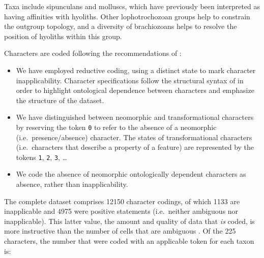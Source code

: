 \documentclass[openany]{book}
\begin{document}
Taxa include sipunculans and molluscs, which have previously been
interpreted as having affinities with hyoliths. Other lophotrochozoan
groups help to constrain the outgroup topology, and a diversity of
brachiozoans helps to resolve the position of hyoliths within this
group.

Characters are coded following the recommendations of
\citet{Brazeau2018}:

\begin{itemize}
\item
  We have employed reductive coding, using a distinct state to mark
  character inapplicability. Character specifications follow the
  structural syntax of \citet{Sereno2007} in order to highlight
  ontological dependence between characters and emphasize the structure
  of the dataset.
\item
  We have distinguished between neomorphic and transformational
  characters \citep[sensu][]{Sereno2007} by reserving the token
  \texttt{0} to refer to the absence of a neomorphic
  (i.e.~presence/absence) character. The states of transformational
  characters (i.e.~characters that describe a property of a feature) are
  represented by the tokens \texttt{1}, \texttt{2}, \texttt{3}, \ldots{}
\item
  We code the absence of neomorphic ontologically dependent characters
  \citep[sensu][]{Vogt2017} as absence, rather than inapplicability.
\end{itemize}

The complete dataset comprises 12150 character codings, of which 1133
are inapplicable and 4975 were positive statements (i.e.~neither
ambiguous nor inapplicable). This latter value, the amount and quality
of data that \emph{is} coded, is more instructive than the number of
cells that are ambiguous \citep{Wiens1998, Wiens2003}. Of the 225
characters, the number that were coded with an applicable token for each
taxon is:
\end{document}
